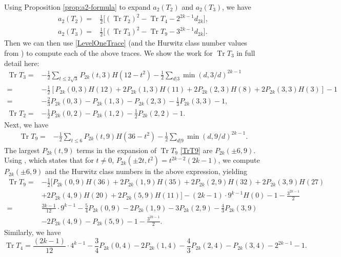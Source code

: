 \documentclass[11pt,letterpaper,reqno]{amsart}
\numberwithin{figure}{section}
\numberwithin{table}{section}
\theoremstyle{definition}
\theoremstyle{plain}
\newcommand{\lrb}[1]{\left[#1\right]}
\theoremstyle{definition}
\theoremstyle{definition}
\theoremstyle{remark}
\numberwithin{equation}{section}
\DeclareMathOperator{\Tr}{Tr}
\begin{document}
Using Proposition \ref{prop:a2-formula} to expand $a_2(T_2)$ and $a_2(T_3)$, we have
\begin{align}
    a_2(T_2)=&\frac{1}{2}\Big[(\Tr T_2)^2-\Tr T_4 -  2^{2k-1}d_{2k} \Big], \\
    a_2(T_3)=&\frac{1}{2}\Big[(\Tr T_3)^2-\Tr T_9- 3^{2k-1}d_{2k} \Big].
\end{align}
Then we can then use \eqref{LevelOneTrace} (and the Hurwitz class number values from \cite[A259825]{oeis}) to compute each of the above traces.
We show the work for $\Tr T_3$ in full detail here:
\begin{align}
    \Tr T_3 =& -\frac{1}{2}\sum_{t\leq2\sqrt{3}}P_{2k}(t,3)H(12-t^2)-\frac{1}{2}\sum_{d|3}\min(d,3/d)^{2k-1}\\
    =&-\frac{1}{2}\lrb{P_{2k}(0,3)H(12)+2P_{2k}(1,3)H(11)+2P_{2k}(2,3)H(8)+2P_{2k}(3,3)H(3)}-1\\
    =&-\frac{2}{3}P_{2k}(0,3)-P_{2k}(1,3)-P_{2k}(2,3)-\frac{1}{3}P_{2k}(3,3)-1,\label{TrT3}  \\
    \Tr T_2 =& -\frac{1}{2}P_{2k}(0,2)-P_{2k}(1,2)-\frac{1}{2}P_{2k}(2,2)-1.\label{eq:T2trace}
\end{align}
Next, we have
\begin{align}
    \Tr T_9 =&-\frac{1}{2}\sum_{t\leq6}P_{2k}(t,9)H(36-t^2)-\frac{1}{2}\sum_{d|9}\min(d,9/d)^{2k-1}.\label{TrT9}
\end{align}
The largest $P_{2k}(t, 9)$ terms in the expansion of $\Tr T_9$ \eqref{TrT9} are $P_{2k}(\pm6, 9)$. Using \cite[Lemma 2.3]{previousPaper}, which states that for $t\neq 0$, $P_{2k}(\pm 2t, t^2) = t^{2k-2}(2k - 1)$, we compute $P_{2k}(\pm 6, 9)$ and the Hurwitz class numbers in the above expression, yielding
\begin{align}
    \Tr T_9 =&-\frac{1}{2}\Bigg[ P_{2k}(0,9)H(36)+2P_{2k}(1,9)H(35)+2P_{2k}(2,9)H(32) + 2P_{2k}(3,9)H(27) \\
    &+2P_{2k}(4,9)H(20)+2P_{2k}(5,9)H(11)\Bigg] -(2k-1)\cdot 9^{k-1}H(0) -1-\frac{3^{2k-1}}{2}\\
    =&\frac{2k-1}{12}\cdot 9^{k-1}-\frac{5}{4}P_{2k}(0,9)-2P_{2k}(1,9)-3P_{2k}(2,9)-\frac{4}{3}P_{2k}(3,9)\\
    &-2P_{2k}(4,9)-P_{2k}(5,9)-1-\frac{3^{2k-1}}{2}.
\end{align}
Similarly, we have
\begin{equation}
    \Tr T_4 = \frac{(2k-1)}{12}\cdot 4^{k-1} -\frac{3}{4}P_{2k}(0, 4) -2P_{2k}(1, 4) - \frac{4}{3}P_{2k}(2, 4) - P_{2k}(3, 4) - 2^{2k-1} - 1.\label{eq:TrT4}
\end{equation}
\end{document}
